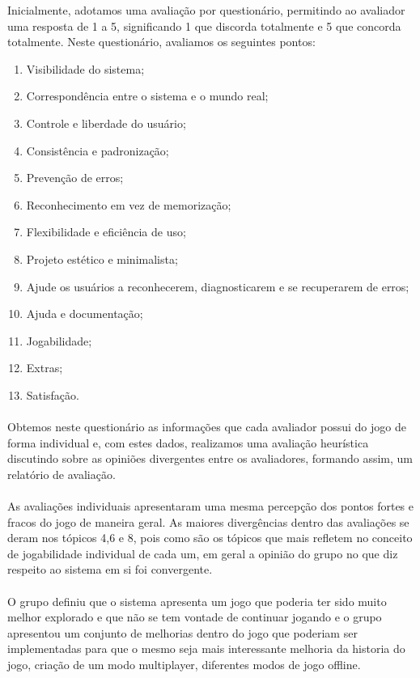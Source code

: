 \documentclass[12pt]{article}
\begin{document}
    Inicialmente, adotamos uma avaliação por questionário, permitindo ao avaliador uma resposta de 1 a 5, significando 1 que discorda totalmente e 5 que concorda totalmente. Neste questionário, avaliamos os seguintes pontos:
        \begin{enumerate}
        \item Visibilidade do sistema;
        \item Correspondência entre o sistema e o mundo real;
        \item Controle e liberdade do usuário;
        \item Consistência e padronização;
        \item Prevenção de erros;
        \item Reconhecimento em vez de memorização;
        \item Flexibilidade e eficiência de uso;
        \item Projeto estético e minimalista;
        \item Ajude os usuários a reconhecerem, diagnosticarem e se recuperarem de erros;
        \item Ajuda e documentação;
        \item Jogabilidade;
        \item Extras;
        \item Satisfação.
        \end{enumerate}
        
    \paragraph{}Obtemos neste questionário as informações que cada avaliador possui do jogo de forma individual e, com estes dados,  realizamos uma avaliação heurística discutindo sobre as opiniões divergentes entre os avaliadores, formando assim, um relatório de avaliação.
   \paragraph{}As avaliações individuais apresentaram uma mesma percepção dos pontos fortes e fracos do jogo de maneira geral. As maiores divergências dentro das avaliações se deram nos tópicos 4,6 e 8, pois como são os tópicos que mais refletem no conceito de jogabilidade individual de cada um, em geral a opinião do grupo no que diz respeito ao sistema em si foi convergente.
   \paragraph{}O grupo definiu que o sistema apresenta um jogo que poderia ter sido muito melhor explorado e que não se tem vontade de continuar jogando e o grupo apresentou um conjunto de melhorias dentro do jogo que poderiam ser implementadas para que o mesmo seja mais interessante melhoria da historia do jogo, criação de um modo multiplayer, diferentes modos de jogo offline.
\end{document}
